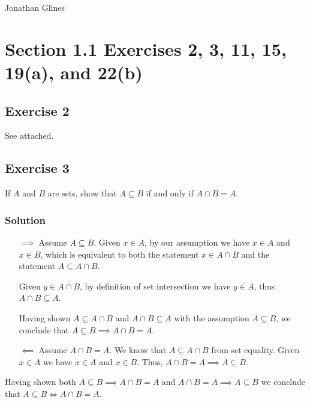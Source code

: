 \documentclass[12pt]{article}
\begin{document}
\begin{flushright}
\Large{Jonathan Glines}
\end{flushright}
\section*{Section 1.1 Exercises 2, 3, 11, 15, 19(a), and 22(b)}
\subsection*{Exercise 2}
See attached.
\subsection*{Exercise 3}
If $A$ and $B$ are sets, show that $A \subseteq B$ if and only if $A \cap B = A$.
\subsubsection*{Solution}
%
%

\begin{itemize}
\item[$\implies$] Assume $A \subseteq B$. Given $x \in A$, by our assumption we have $x \in A$ and $x \in B$, which is equivalent to both the statement $x \in A \cap B$ and the statement $A \subseteq A \cap B$.

Given $y \in A \cap B$, by definition of set intersection we have $y \in A$, thus $A \cap B \subseteq A$.

Having shown $A \subseteq A \cap B$ and $A \cap B \subseteq A$ with the assumption $A \subseteq B$, we conclude that $A \subseteq B \implies A \cap B = A$.

\item[$\impliedby$] Assume $A \cap B = A$. We know that $A \subseteq A \cap B$ from set equality. Given $x \in A$ we have $x \in A$ and $x \in B$. Thus, $A \cap B = A \implies A \subseteq B$.
\end{itemize}
Having shown both $A \subseteq B \implies A \cap B = A$ and $A \cap B = A \implies A \subseteq B$ we conclude that $A \subseteq B \iff A \cap B = A$.
\end{document}
